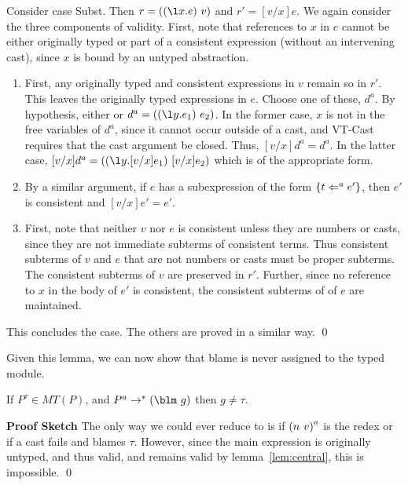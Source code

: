 {Consider case {\sc Subst}. Then $r = \comb{\dlsabs{x}{e}}{v}$ and $r'
= [v/x]e$.  We again consider the three components of validity.
First, note that references to $x$ in $e$ cannot be either originally
typed or part of a consistent expression (without an intervening
cast), since $x$ is bound by an untyped abstraction.
\begin{enumerate}
\item    First, any
  originally typed and consistent expressions in $v$ remain so in
  $r'$.  This leaves the originally typed expressions in $e$.  Choose
  one of these, $d^a$.  By hypothesis, either  or $d^a
  = \comb{\dlsabs{y}{e_1}}{e_2}$. In the former case, $x$
  is not in the free variables of $d^a$, since it cannot occur outside
  of a cast, and {\sc VT-Cast} requires that the cast argument be
  closed. Thus, $[v/x]d^a = d^a$.  In the latter case, $[v/x]d^a =
  \comb{\dlsabs{y}{[v/x]e_1}}{[v/x]e_2}$ which is of the appropriate
  form.  
\item By a similar argument, if $e$ has a subexpression of the form
  $\{t \Leftarrow^{a} e'\}$, then $e'$ is consistent and $[v/x]e' = e'$.
\item  First, note that neither $v$ nor $e$ is consistent unless they are numbers or
  casts, since they are not  immediate subterms of  consistent terms.
  Thus consistent subterms of $v$ and $e$ that are not numbers or
  casts must be proper subterms.  The consistent subterms of $v$ are
  preserved in $r'$.  Further, since no reference to $x$ in the body
  of $e'$ is consistent, the consistent subterms of of $e$ are
  maintained. 
\end{enumerate}


This concludes the case.  The others are proved in a similar way.  \qed

Given this lemma, we can now show that blame is never assigned to the
typed module.

\begin{lemma}
  If $P^\tau \in MT(P)$, and $P^\tau \dlsreduces \blame{g}$ then $g \neq
  \tau$.
  \label{lem:no-blame}
\end{lemma}

\noindent\textbf{Proof Sketch}
The only way we could ever reduce to \blame{\tau} is if 
${(n\ v)}^a$ is the redex or if a cast fails and blames $\tau$.
However, since the main expression is originally untyped, and thus
valid, and remains valid by lemma~\ref{lem:central}, this is impossible. \qed

}
